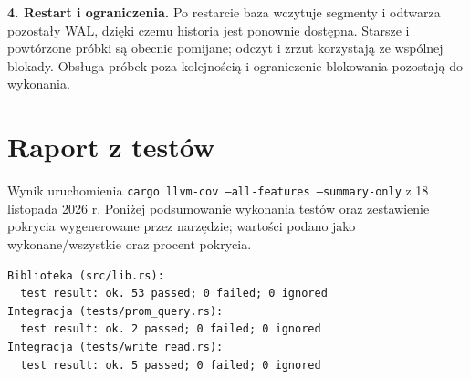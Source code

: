\documentclass[11pt,a4paper]{article}
\begin{document}
\textbf{4. Restart i ograniczenia.}
Po restarcie baza wczytuje segmenty i odtwarza pozostały WAL, dzięki czemu
historia jest ponownie dostępna. Starsze i powtórzone próbki są obecnie pomijane;
odczyt i zrzut korzystają ze wspólnej blokady. Obsługa próbek poza kolejnością
i ograniczenie blokowania pozostają do wykonania.

\clearpage
\section{Raport z testów}
Wynik uruchomienia \texttt{cargo llvm-cov --all-features --summary-only}
z 18 listopada 2026 r. Poniżej podsumowanie wykonania testów oraz zestawienie
pokrycia wygenerowane przez narzędzie; wartości podano jako wykonane/wszystkie
oraz procent pokrycia.

\begin{lstlisting}
Biblioteka (src/lib.rs):
  test result: ok. 53 passed; 0 failed; 0 ignored
Integracja (tests/prom_query.rs):
  test result: ok. 2 passed; 0 failed; 0 ignored
Integracja (tests/write_read.rs):
  test result: ok. 5 passed; 0 failed; 0 ignored
\end{lstlisting}
\end{document}
